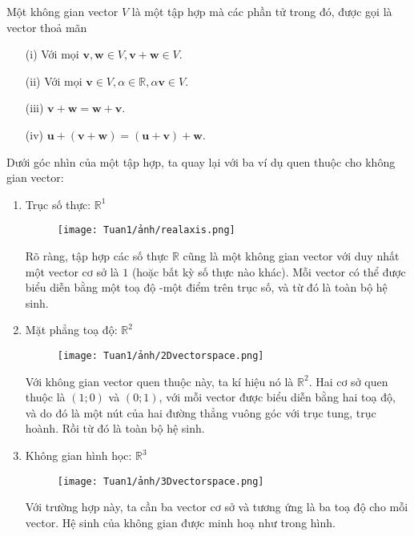 \begin{definition}\label{def2.2.4}
    Một không gian vector \(V\) là một tập hợp mà các phần tử trong đó, được gọi là vector thoả mãn 
    \begin{enumerate}
        \item[(i)] Với mọi \(\mathbf{v}, \mathbf{w}\in V , \mathbf{v}+\mathbf{w}\in V\).
        \item[(ii)] Với mọi \(\mathbf{v}\in V, \alpha\in \mathbb{R}, \alpha\mathbf{v}\in V\).
        \item[(iii)]  \(\mathbf{v}+\mathbf{w}=\mathbf{w}+\mathbf{v}\).
        \item[(iv)]    \(\mathbf{u}+(\mathbf{v}+\mathbf{w})=(\mathbf{u}+\mathbf{v})+\mathbf{w}\).
    \end{enumerate}
\end{definition}
Dưới góc nhìn của một tập hợp, ta quay lại với ba ví dụ quen thuộc cho không gian vector:
\begin{enumerate}[label=(\alph*)]
    \item Trục số thực: \(\mathbb{R}^1\)
    \begin{figure}[H]
        \centering
        \texttt{[image: Tuan1/ảnh/realaxis.png]}
    \end{figure}
    Rõ ràng, tập hợp các số thực \(\mathbb{R}\) cũng là một không gian vector với duy nhất một vector cơ sở là \(1\) (hoặc bất kỳ số thực nào khác). Mỗi vector có thể được biểu diễn bằng một toạ độ -một điểm trên trục số, và từ đó là toàn bộ hệ sinh.
    \item Mặt phẳng toạ độ: \(\mathbb{R}^2\)
    \begin{figure}[H]
        \centering
        \texttt{[image: Tuan1/ảnh/2Dvectorspace.png]}
    \end{figure}
    Với không gian vector quen thuộc này, ta kí hiệu nó là \(\mathbb{R}^2\). Hai cơ sở quen thuộc là \((1;0)\) và \((0;1)\), với mỗi vector được biểu diễn bằng hai toạ độ, và do đó là một nút của hai đường thẳng vuông góc với trục tung, trục hoành. Rồi từ đó là toàn bộ hệ sinh.
    \item Không gian hình học: \(\mathbb{R}^3\)
    \begin{figure}[H]
        \centering
        \texttt{[image: Tuan1/ảnh/3Dvectorspace.png]}
    \end{figure}
    Với trường hợp này, ta cần ba vector cơ sở và tương ứng là ba toạ độ cho mỗi vector. Hệ sinh của không gian được minh hoạ như trong hình.
\end{enumerate}
